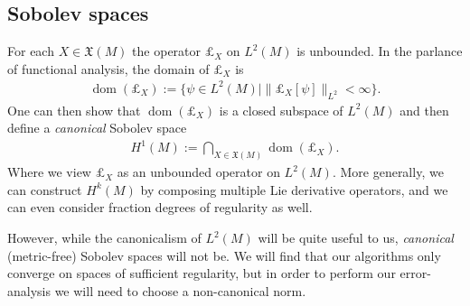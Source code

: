 \documentclass[final,leqno]{siamltex1213}
\begin{document}
\subsection{Sobolev spaces}
\label{sec:Sobolev spaces}
For each $X \in \mathfrak{X}(M)$ the operator $\pounds_{X}$ on $L^{2}(M)$ is unbounded.
In the parlance of functional analysis, the domain of $\pounds_{X}$ is
\begin{align}
	\operatorname{dom}( \pounds_{X} ) := \{ \psi \in L^{2}(M) \mid  \| \pounds_{X}[\psi] \|_{L^{2}} < \infty \}.
\end{align}
One can then show that $\operatorname{dom}( \pounds_{X} )$ is a closed subspace of $L^{2}(M)$ and then define
a \emph{canonical} Sobolev space
\begin{align}
	H^{1}(M) := \bigcap_{X \in \mathfrak{X}(M)} \operatorname{dom}( \pounds_{X} ).
\end{align}
Where we view $\pounds_{X}$ as an unbounded operator on $L^{2}(M)$.
More generally, we can construct $H^{k}(M)$ by composing multiple Lie derivative operators,
and we can even consider fraction degrees of regularity as well.

  However, while the canonicalism of $L^{2}(M)$ will be quite useful to us,
  \emph{canonical} (metric-free) Sobolev spaces will not be.
  We will find that our algorithms only converge on spaces of sufficient regularity,
  but in order to perform our error-analysis we will need to choose a non-canonical norm.
  
\end{document}
